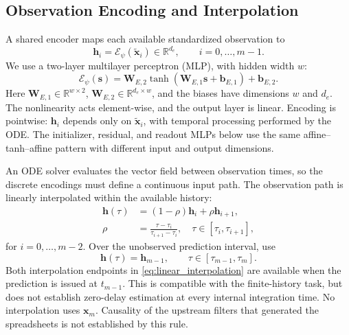 \documentclass[journal,twoside]{IEEEtran}
\begin{document}
\subsection{Observation Encoding and Interpolation}
\label{subsec:observation}
A shared encoder maps each available standardized observation to
\begin{equation}
    \mathbf h_i=\mathcal E_\psi(\tilde{\mathbf x}_i)
    \in\mathbb R^{d_e},\qquad i=0,\ldots,m-1.
    \label{eq:observation_encoder}
\end{equation}
We use a two-layer multilayer perceptron (MLP), with hidden width $w$:
\begin{equation}
    \mathcal E_\psi(\mathbf s)=
    \mathbf W_{E,2}\tanh(\mathbf W_{E,1}\mathbf s+\mathbf b_{E,1})
    +\mathbf b_{E,2}.
    \label{eq:encoder_mlp}
\end{equation}
Here $\mathbf W_{E,1}\in\mathbb R^{w\times2}$,
$\mathbf W_{E,2}\in\mathbb R^{d_e\times w}$, and the biases have
dimensions $w$ and $d_e$. The nonlinearity acts element-wise, and the
output layer is linear. Encoding is pointwise: $\mathbf h_i$ depends only
on $\tilde{\mathbf x}_i$, with temporal processing performed by the ODE.
The initializer, residual, and readout MLPs below use the same
affine--tanh--affine pattern with different input and output dimensions.

An ODE solver evaluates the vector field between observation times, so
the discrete encodings must define a continuous input path.
The observation path is linearly interpolated within the available history:
\begin{equation}
\begin{aligned}
    \mathbf h(\tau)&=(1-\rho)\mathbf h_i+\rho\mathbf h_{i+1},\\
    \rho&=\frac{\tau-\tau_i}{\tau_{i+1}-\tau_i},
    \quad \tau\in[\tau_i,\tau_{i+1}],
\end{aligned}
\label{eq:linear_interpolation}
\end{equation}
for $i=0,\ldots,m-2$. Over the unobserved prediction interval, use
\begin{equation}
    \mathbf h(\tau)=\mathbf h_{m-1},
    \qquad \tau\in[\tau_{m-1},\tau_m].
    \label{eq:continuous_observation}
\end{equation}
Both interpolation endpoints in \eqref{eq:linear_interpolation} are
available when the prediction is issued at $t_{m-1}$. This is compatible
with the finite-history task, but does not establish zero-delay estimation
at every internal integration time. No interpolation uses $\mathbf x_m$.
Causality of the upstream filters that generated the spreadsheets is not
established by this rule.
\end{document}
